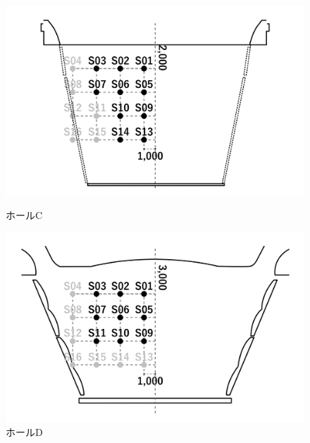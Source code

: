 \documentclass[11pt,a4j]{jreport}
\begin{document}
\begin{figure}[H]
  \begin{minipage}[b]{.5\textwidth}
    \centering
    \includegraphics[width=.9\linewidth]{images/measuredHalls/flatud_hall_c.png}
    \caption*{ホールC}
  \end{minipage}%
  \begin{minipage}[b]{.5\textwidth}
    \centering
    \includegraphics[width=.9\linewidth]{images/measuredHalls/flatud_hall_d.png}
    \caption*{ホールD}
  \end{minipage}


\end{figure}
\end{document}
